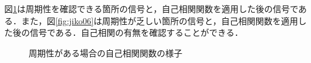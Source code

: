 図\ref{fig:jiko04}は周期性を確認できる箇所の信号と，自己相関関数を適用した後の信号である．また，図\ref{fig:jiko06}は周期性が乏しい箇所の信号と，自己相関関数を適用した後の信号である．自己相関の有無を確認することができる．
\begin{figure}[tbhp]
  \caption{周期性がある場合の自己相関関数の様子}
  \label{fig:jiko04}
\end{figure}

